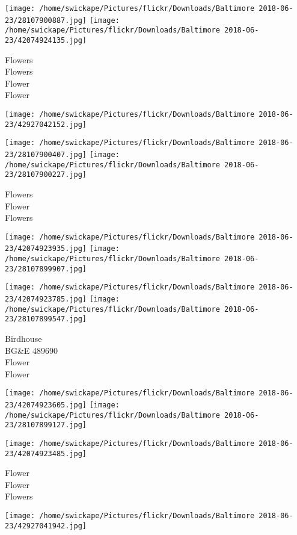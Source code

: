 \documentclass[10pt,letterpaper]{article}
\begin{document}
\texttt{[image: /home/swickape/Pictures/flickr/Downloads/Baltimore 2018-06-23/28107900887.jpg]}
\texttt{[image: /home/swickape/Pictures/flickr/Downloads/Baltimore 2018-06-23/42074924135.jpg]}

Flowers\\
Flowers\\
Flower\\
Flower\\
\pagebreak

\texttt{[image: /home/swickape/Pictures/flickr/Downloads/Baltimore 2018-06-23/42927042152.jpg]}

\vspace{0.25in}
\texttt{[image: /home/swickape/Pictures/flickr/Downloads/Baltimore 2018-06-23/28107900407.jpg]}
\texttt{[image: /home/swickape/Pictures/flickr/Downloads/Baltimore 2018-06-23/28107900227.jpg]}

Flowers\\
Flower\\
Flowers\\
\pagebreak

\texttt{[image: /home/swickape/Pictures/flickr/Downloads/Baltimore 2018-06-23/42074923935.jpg]}
\texttt{[image: /home/swickape/Pictures/flickr/Downloads/Baltimore 2018-06-23/28107899907.jpg]}

\texttt{[image: /home/swickape/Pictures/flickr/Downloads/Baltimore 2018-06-23/42074923785.jpg]}
\texttt{[image: /home/swickape/Pictures/flickr/Downloads/Baltimore 2018-06-23/28107899547.jpg]}

Birdhouse\\
BG\&E 489690\\
Flower\\
Flower\\
\pagebreak

\texttt{[image: /home/swickape/Pictures/flickr/Downloads/Baltimore 2018-06-23/42074923605.jpg]}
\texttt{[image: /home/swickape/Pictures/flickr/Downloads/Baltimore 2018-06-23/28107899127.jpg]}

\texttt{[image: /home/swickape/Pictures/flickr/Downloads/Baltimore 2018-06-23/42074923485.jpg]}

Flower\\
Flower\\
Flowers\\
\pagebreak

\texttt{[image: /home/swickape/Pictures/flickr/Downloads/Baltimore 2018-06-23/42927041942.jpg]}
\end{document}
